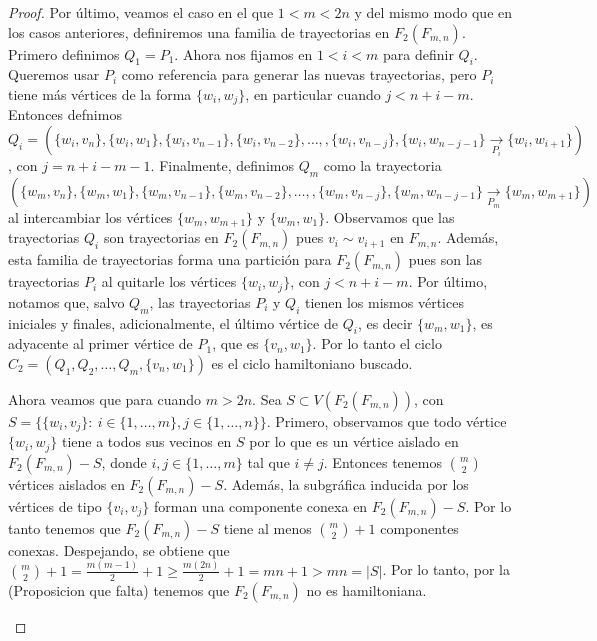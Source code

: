 \begin{proof}
    Por \'ultimo, veamos el caso en el que $1<m<2n$ y del mismo modo que en los
    casos anteriores, definiremos una familia de trayectorias en $F_2(F_{m,n})$.
    Primero definimos $Q_1 =P_1$. Ahora nos fijamos en $1<i<m$ para definir
    $Q_i$. Queremos usar $P_i$ como referencia para generar las nuevas
    trayectorias, pero $P_i$ tiene m\'as v\'ertices de la forma $\{w_i,w_j\}$,
    en particular cuando $j< n+i-m$. Entonces defnimos $Q_i =
    (\{w_i,v_n\},\{w_i,w_1\},\{w_i,v_{n-1}\},\{w_i,v_{n-2}\}, \dots,
    ,\{w_i,v_{n-j}\},\{w_i,w_{n-j-1}\}\xrightarrow[P_i]{}\{w_i,w_{i+1}\})$, con
    $j = n+i-m-1$. Finalmente, definimos $Q_m$ como la trayectoria
    $(\{w_m,v_n\},\{w_m,w_1\},\{w_m,v_{n-1}\},\{w_m,v_{n-2}\}, \dots,
    ,\{w_m,v_{n-j}\},\{w_m,w_{n-j-1}\}\xrightarrow[P_m]{}\{w_m,w_{m+1}\})$ al
    intercambiar los v\'ertices $\{w_m,w_{m+1}\}$ y $\{w_m,w_1\}$. Observamos
    que las trayectorias $Q_i$ son trayectorias en $F_2(F_{m,n})$ pues $v_i \sim
    v_{i+1}$ en $F_{m,n}$. Adem\'as, esta familia de trayectorias forma una
    partici\'on para $F_2(F_{m,n})$ pues son las trayectorias $P_i$ al quitarle
    los v\'ertices $\{w_i,w_j\}$, con $j< n+i-m$. Por \'ultimo, notamos que,
    salvo $Q_m$, las trayectorias $P_i$ y $Q_i$ tienen los mismos v\'ertices
    iniciales y finales, adicionalmente, el \'ultimo v\'ertice de $Q_i$, es
    decir $\{w_m,w_1\}$, es adyacente al primer v\'ertice de $P_1$, que es
    $\{v_n,w_1\}$. Por lo tanto el ciclo $C_2=(Q_1,Q_2, \dots, Q_m,
    \{v_n,w_1\})$ es el ciclo hamiltoniano buscado.

    Ahora veamos que para cuando $m>2n$. Sea $S \subset V(F_2(F_{m,n}))$, con
    $S=\{\{w_i,v_j\} \colon\ i \in \{1,\dots,m\},j\in\{1,\dots,n\}\}$. Primero,
    observamos que todo v\'ertice $\{w_i,w_j\}$ tiene a todos sus vecinos en $S$
    por lo que es un v\'ertice aislado en $F_2(F_{m,n})-S$, donde $i,j \in
    \{1,\dots,m\}$ tal que $i \neq j$. Entonces tenemos $\binom{m}{2}$
    v\'ertices aislados en $F_2(F_{m,n})-S$. Adem\'as, la subgr\'afica inducida
    por los v\'ertices de tipo $\{v_i,v_j\}$ forman una componente conexa en
    $F_2(F_{m,n})-S$. Por lo tanto tenemos que $F_2(F_{m,n})-S$ tiene al menos
    $\binom{m}{2} + 1$ componentes conexas. Despejando, se obtiene que
    $\binom{m}{2} + 1 = \frac{m(m-1)}{2} + 1 \geq \frac{m(2n)}{2} + 1 = mn + 1 >
    mn = |S|$. Por lo tanto, por la (Proposicion que falta) tenemos que
    $F_2(F_{m,n})$ no es hamiltoniana.

    \begin{figure}[ht!]
        \centering
           \begin{tikzpicture}


\end{tikzpicture}
\end{figure}
\end{proof}
